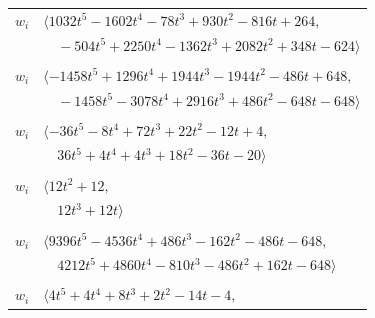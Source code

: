 \documentclass[11pt]{article}
\begin{document}
\begin{longtable}{@{}ll@{}}
$w_i$ & $\langle 1032t^{5}-1602t^{4}-78t^{3}+930t^{2}-816t+264,$\\
 & $\quad -504t^{5}+2250t^{4}-1362t^{3}+2082t^{2}+348t-624\rangle$\\
\addlinespace[2pt]
\multicolumn{2}{@{}p{0.97\textwidth}@{}}{$i=11$, $D_i=162$, $\rho_{ij}$: $1{:}3, \allowbreak 2{:}3, \allowbreak 5{:}2, \allowbreak 7{:}1, \allowbreak 17{:}3, \allowbreak 20{:}2, \allowbreak 22{:}3, \allowbreak 25{:}1, \allowbreak 27{:}1, \allowbreak 33{:}2, \allowbreak 41{:}1$}\\
$w_i$ & $\langle -1458t^{5}+1296t^{4}+1944t^{3}-1944t^{2}-486t+648,$\\
 & $\quad -1458t^{5}-3078t^{4}+2916t^{3}+486t^{2}-648t-648\rangle$\\
\addlinespace[2pt]
\multicolumn{2}{@{}p{0.97\textwidth}@{}}{$i=12$, $D_i=4$, $\rho_{ij}$: $0{:}1, \allowbreak 1{:}2, \allowbreak 4{:}1, \allowbreak 6{:}3, \allowbreak 15{:}3, \allowbreak 21{:}2, \allowbreak 25{:}1, \allowbreak 26{:}2, \allowbreak 30{:}3, \allowbreak 36{:}1, \allowbreak 40{:}2$}\\
$w_i$ & $\langle -36t^{5}-8t^{4}+72t^{3}+22t^{2}-12t+4,$\\
 & $\quad 36t^{5}+4t^{4}+4t^{3}+18t^{2}-36t-20\rangle$\\
\addlinespace[2pt]
\multicolumn{2}{@{}p{0.97\textwidth}@{}}{$i=13$, $D_i=2$, $\rho_{ij}$: $0{:}1, \allowbreak 16{:}3, \allowbreak 18{:}1, \allowbreak 19{:}1, \allowbreak 28{:}3$}\\
$w_i$ & $\langle 12t^{2}+12,$\\
 & $\quad 12t^{3}+12t\rangle$\\
\addlinespace[2pt]
\multicolumn{2}{@{}p{0.97\textwidth}@{}}{$i=14$, $D_i=162$, $\rho_{ij}$: $0{:}1, \allowbreak 1{:}3, \allowbreak 6{:}1, \allowbreak 10{:}1, \allowbreak 17{:}2, \allowbreak 20{:}2, \allowbreak 21{:}1, \allowbreak 23{:}2, \allowbreak 27{:}1, \allowbreak 36{:}1, \allowbreak 37{:}3, \allowbreak 40{:}3, \allowbreak 41{:}1$}\\
$w_i$ & $\langle 9396t^{5}-4536t^{4}+486t^{3}-162t^{2}-486t-648,$\\
 & $\quad 4212t^{5}+4860t^{4}-810t^{3}-486t^{2}+162t-648\rangle$\\
\addlinespace[2pt]
\multicolumn{2}{@{}p{0.97\textwidth}@{}}{$i=15$, $D_i=2$, $\rho_{ij}$: $0{:}1, \allowbreak 1{:}3, \allowbreak 5{:}3, \allowbreak 6{:}1, \allowbreak 12{:}1, \allowbreak 20{:}2, \allowbreak 21{:}3, \allowbreak 23{:}1, \allowbreak 25{:}2, \allowbreak 39{:}1$}\\
$w_i$ & $\langle 4t^{5}+4t^{4}+8t^{3}+2t^{2}-14t-4,$\\

\end{longtable}
\end{document}
